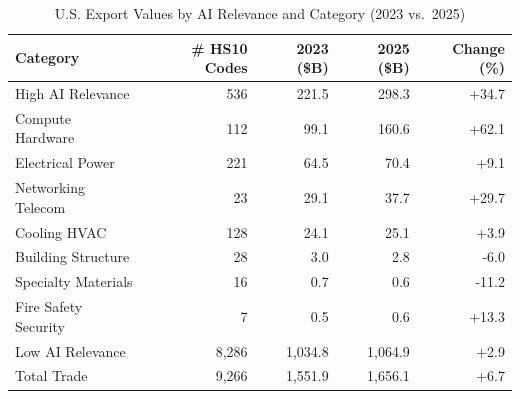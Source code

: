 \begin{table}[htbp]
\centering
\caption{U.S. Export Values by AI Relevance and Category (2023 vs.\ 2025)}
\label{tab:trade_hierarchical_exports}
\setlength{\tabcolsep}{4.5mm}
\renewcommand{\arraystretch}{1.60}
\begin{tabular}{lrrrr}
\toprule
Category & \# HS10 Codes & 2023 (\$B) & 2025 (\$B) & Change (\%) \\
\midrule
High AI Relevance & 536 & 221.5 & 298.3 & +34.7 \\
\quad\quad Compute Hardware & 112 & 99.1 & 160.6 & +62.1 \\
\quad\quad Electrical Power & 221 & 64.5 & 70.4 & +9.1 \\
\quad\quad Networking Telecom & 23 & 29.1 & 37.7 & +29.7 \\
\quad\quad Cooling HVAC & 128 & 24.1 & 25.1 & +3.9 \\
\quad\quad Building Structure & 28 & 3.0 & 2.8 & -6.0 \\
\quad\quad Specialty Materials & 16 & 0.7 & 0.6 & -11.2 \\
\quad\quad Fire Safety Security & 7 & 0.5 & 0.6 & +13.3 \\
Low AI Relevance & 8,286 & 1,034.8 & 1,064.9 & +2.9 \\
\midrule
Total Trade & 9,266 & 1,551.9 & 1,656.1 & +6.7 \\
\bottomrule
\end{tabular}
\end{table}
